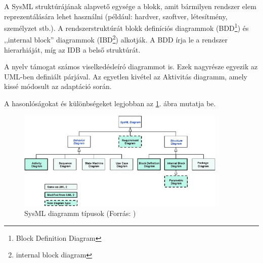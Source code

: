 A SysML struktúrájának alapvető egysége a blokk, amit bármilyen rendszer elem reprezentálására lehet használni (például: hardver, szoftver, létesítmény, személyzet stb.).
A rendszerstruktúrát blokk definíciós diagrammok (BDD\footnote{Block Definition Diagram}) és ,,internal block'' diagrammok (IBD\footnote{internal block diagram}) alkotják.
A BDD írja le a rendszer hierarhiáját, míg az IDB a belső struktúrát.

A nyelv támogat számos viselkedésleíró diagrammot is. Ezek nagyrésze egyezik az UML-ben definiált párjával.
Az egyetlen kivétel az Aktivitás diagramm, amely kissé módosult az adaptáció során.

A hasonlóságokat és különbségeket legjobban az \ref{fig:sysDiag}. ábra mutatja be.

\begin{figure}
    \footnotesize
    \centering
    \includegraphics[width=100mm, keepaspectratio]{figures/sysml_diagrams.jpg}
    \caption{SysML diagramm típusok (Forrás: \cite{omgsysml})}
    \label{fig:sysDiag}
\end{figure}